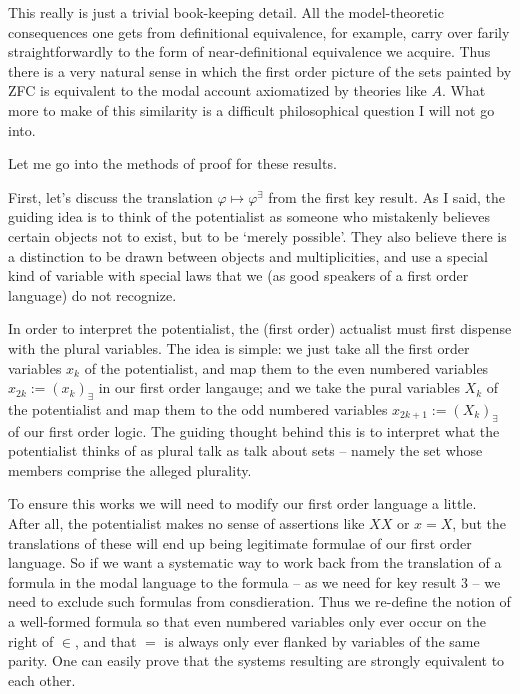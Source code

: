 \documentclass{article}
\begin{document}
This really is just a trivial book-keeping detail. All the model-theoretic consequences one gets 
from definitional equivalence, for example, carry over farily straightforwardly to the form of 
near-definitional equivalence we acquire. Thus there is a very natural sense in which the first order 
picture of the sets painted by ZFC is equivalent to the modal account axiomatized by theories like $A$. 
What more to make of this similarity is a difficult philosophical question I will not go into.

Let me go into the methods of proof for these results. 

First, let's discuss the translation $\varphi \mapsto \varphi^\exists$ from the first key result.
As I said, the guiding idea is to think of the potentialist as someone who mistakenly believes 
certain objects not to exist, but to be `merely possible'. They also believe there is a distinction 
to be drawn between objects and multiplicities, and use a special kind of variable with special laws 
that we (as good speakers of a first order language) do not recognize. 

In order to interpret the potentialist, the (first order) actualist must first dispense with the plural 
variables. The idea is simple: we just take all the first order variables $x_k$ of the potentialist, and 
map them to the even numbered variables $x_{2k} := (x_k)_\exists$ in our first order langauge; 
and we take the pural variables $X_k$ of the 
potentialist and map them to the odd numbered variables $x_{2k+1} := (X_k)_\exists$ 
of our first order logic. The guiding thought behind this is to interpret 
what the potentialist thinks of as plural talk as talk about sets -- namely the set whose members comprise 
the alleged plurality. 

To ensure this works we will need to modify our first order language a little. 
After all, the potentialist makes no sense of assertions like $XX$ or $x = X$, but the translations 
of these will end up being legitimate formulae of our first order language. So if we want a systematic way to
work back from the translation of a formula in the modal language to the formula -- as we need for 
key result 3 -- we need to exclude such formulas from consdieration. Thus we re-define the notion 
of a well-formed formula so that even numbered variables only ever occur on the right of $\in$, 
and that $=$ is always only ever flanked by variables of the same parity. One can easily prove 
that the systems resulting are strongly equivalent to each other. 
\end{document}
